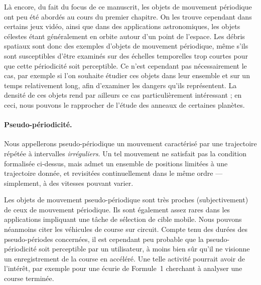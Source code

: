 	Là encore, du fait du focus de ce manuscrit, les objets de mouvement périodique ont peu été abordés au cours du premier chapitre. On les trouve cependant dans certains jeux vidéo, ainsi que dans des applications astronomiques, les objets célestes étant généralement en orbite autour d'un point de l'espace. Les débris spatiaux sont donc des exemples d'objets de mouvement périodique, même s'ils sont susceptibles d'être examinés sur des échelles temporelles trop courtes pour que cette périodicité soit perceptible. Ce n'est cependant pas nécessairement le cas, par exemple si l'on souhaite étudier ces objets dans leur ensemble et sur un temps relativement long, afin d'examiner les dangers qu'ils représentent. La densité de ces objets rend par ailleurs ce cas particulièrement intéressant ; en ceci, nous pouvons le rapprocher de l'étude des anneaux de certaines planètes.\footnotemark{}
	
	
	\paragraph{Pseudo-périodicité.}
	Nous appellerons pseudo-périodique un mouvement caractérisé par une trajectoire répétée à intervalles \emph{irréguliers}. Un tel mouvement ne satisfait pas la condition formalisée ci-dessus, mais admet un ensemble de positions limitées à une trajectoire donnée, et revisitées continuellement dans le même ordre --- simplement, à des vitesses pouvant varier.
	
	Les objets de mouvement pseudo-périodique sont très proches (subjectivement) de ceux de mouvement périodique. Ils sont également assez rares dans les applications impliquant une tâche de sélection de cible mobile. Nous pouvons néanmoins citer les véhicules de course sur circuit. Compte tenu des durées des pseudo-périodes concernées, il est cependant peu probable que la pseudo-périodicité soit perceptible par un utilisateur, à moins bien sûr qu'il ne visionne un enregistrement de la course en accéléré. Une telle activité pourrait avoir de l'intérêt, par exemple pour une écurie de Formule~1 cherchant à analyser une course terminée.
	
